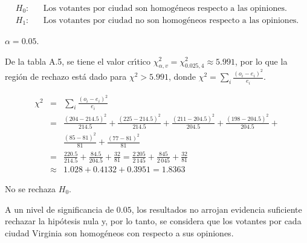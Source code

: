 \begin{solucion}
 \begin{hipotesis}
  \begin{eqnarray*}
   H_0: & &
   \text{Los votantes por ciudad son homog\'eneos respecto a las opiniones.} \\
   H_1: & &
   \text{Los votantes por ciudad no son homog\'eneos respecto a las opiniones.}
  \end{eqnarray*}
 \end{hipotesis}

 \begin{significancia}
  $\alpha = 0.05$.
 \end{significancia}

 \begin{region}
  De la tabla A.5, se tiene el valor cr\'{\i}tico
  $\chi^2_{\alpha,v} = \chi^2_{0.025,4} \approx 5.991$,
  por lo que la regi\'on de rechazo est\'a dado
  para $\chi^2 > 5.991$, donde
  $\chi^2 = \sum_{i} \frac{\left( o_i - e_i \right)^2}{e_i}$.
 \end{region}

 \begin{estadistico}
  \begin{eqnarray*}
   \chi^2 & = & \sum_{i} \frac{\left( o_i - e_i \right)^2}{e_i} \\
   & = & \frac{(204 - 214.5)^2}{214.5} + \frac{(225 - 214.5)^2}{214.5} +
   \frac{(211 - 204.5)^2}{204.5} + \frac{(198 - 204.5)^2}{204.5} + \\
   & & \frac{(85 - 81)^2}{81} + \frac{(77 - 81)^2}{81} \\
   & = & \frac{220.5}{214.5} + \frac{84.5}{204.5} + \frac{32}{81}
   = \frac{2\,205}{2\,145} + \frac{845}{2\,045} + \frac{32}{81} \\
   & \approx & 1.028 + 0.4132 + 0.3951 = 1.8363
  \end{eqnarray*}
 \end{estadistico}

 \begin{decision}
  No se rechaza $H_0$.
 \end{decision}

 \begin{conclusion}
  A un nivel de significancia de $0.05$, los resultados no arrojan
  evidencia suficiente rechazar la hip\'otesis nula
  y, por lo tanto, se considera que los votantes por cada ciudad
  Virginia son homog\'eneos con respecto a sus opiniones.
 \end{conclusion}


\end{solucion}
